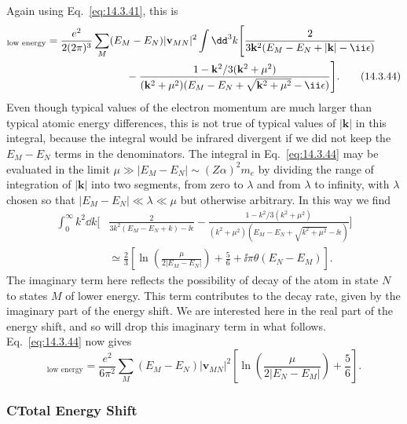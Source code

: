 Again using Eq.~\eqref{eq:14.3.41}, this is
\begin{align}
[\delta E_N]_{\text{low energy}}={}&
\frac{e^2}{2(2\pi)^3}\sum_M(E_M-E_N)|\mathbf v_{MN}|^2
\int \dd^3k\Biggl[
\frac{2}{3\mathbf k^2(E_M-E_N+|\mathbf k|-\ii\epsilon)}\notag\\
&\hspace{22mm}-
\frac{1-\mathbf k^2/3(\mathbf k^2+\mu^2)}
{(\mathbf k^2+\mu^2)(E_M-E_N+\sqrt{\mathbf k^2+\mu^2}-\ii\epsilon)}
\Biggr].
\tag{14.3.44}\label{eq:14.3.44}
\end{align}
Even though typical values of the electron momentum are much larger than
typical atomic energy differences, this is not true of typical values of
$|\mathbf k|$ in this integral, because the integral would be infrared
divergent if we did not keep the $E_M-E_N$ terms in the denominators. The
integral in Eq.~\eqref{eq:14.3.44} may be evaluated in the limit
$\mu\gg|E_M-E_N|\sim(Z\alpha)^2m_e$ by dividing the range of integration of
$|\mathbf k|$ into two segments, from zero to $\lambda$ and from $\lambda$ to
infinity, with $\lambda$ chosen so that $|E_M-E_N|\ll\lambda\ll\mu$ but
otherwise arbitrary. In this way we find
\begin{align*}
\int_0^\infty k^2\dd k\Biggl[&
\frac{2}{3k^2(E_M-E_N+k)-\ii\epsilon}
-\frac{1-k^2/3(k^2+\mu^2)}
{(k^2+\mu^2)(E_M-E_N+\sqrt{k^2+\mu^2}-\ii\epsilon)}\Biggr]\\
&\simeq\frac23\left[\ln\left(\frac{\mu}{2|E_M-E_N|}\right)
+\frac56+\ii\pi\theta(E_N-E_M)\right].
\end{align*}
The imaginary term here reflects the possibility of decay of the atom in
state $N$ to states $M$ of lower energy. This term contributes to the decay
rate, given by the imaginary part of the energy shift. We are interested here
in the real part of the energy shift, and so will drop this imaginary term in
what follows. Eq.~\eqref{eq:14.3.44} now gives
\begin{equation}
[\delta E_N]_{\text{low energy}}
=\frac{e^2}{6\pi^2}\sum_M(E_M-E_N)|\mathbf v_{MN}|^2
\left[\ln\left(\frac{\mu}{2|E_N-E_M|}\right)+\frac56\right].
\tag{14.3.45}\label{eq:14.3.45}
\end{equation}

\subsubsection*{C\quad Total Energy Shift}


